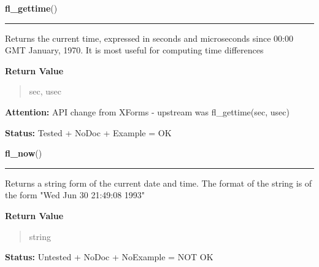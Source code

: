     \label{xformslib:library:fl_gettime}

    \vspace{0.5ex}

\hspace{.8\funcindent}\begin{boxedminipage}{\funcwidth}

    \raggedright \textbf{fl\_gettime}()

    \vspace{-1.5ex}

    \rule{\textwidth}{0.5\fboxrule}
\setlength{\parskip}{2ex}
    Returns the current time, expressed in seconds and microseconds since 
    00:00 GMT January, 1970. It is most useful for computing time 
    differences

\setlength{\parskip}{1ex}
      \textbf{Return Value}
    \vspace{-1ex}

      \begin{quote}
      sec, usec

      \end{quote}

\textbf{Attention:} API change from XForms - upstream was fl\_gettime(sec, usec)



\textbf{Status:} Tested + NoDoc + Example = OK



    \end{boxedminipage}

    \label{xformslib:library:fl_now}

    \vspace{0.5ex}

\hspace{.8\funcindent}\begin{boxedminipage}{\funcwidth}

    \raggedright \textbf{fl\_now}()

    \vspace{-1.5ex}

    \rule{\textwidth}{0.5\fboxrule}
\setlength{\parskip}{2ex}
    Returns a string form of the current date and time. The format of the 
    string is of the form "Wed Jun 30 21:49:08 1993"

\setlength{\parskip}{1ex}
      \textbf{Return Value}
    \vspace{-1ex}

      \begin{quote}
      string

      \end{quote}

\textbf{Status:} Untested + NoDoc + NoExample = NOT OK



    \end{boxedminipage}

